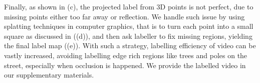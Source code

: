Finally, as shown in (c), the projected label from 3D points is not perfect, due to missing points either too far away or reflection. We handle such issue by using splatting techniques in computer graphics, that is to turn each point into a small square as discussed in  ((d)), and then ask labeller to fix missing regions, yielding the final label map ((e)).
With such a strategy, labelling efficiency of video can be vastly increased, avoiding labelling edge rich regions like trees and poles on the street, especially when occlusion is happened.
We provide the labelled video in our supplementary materials.

